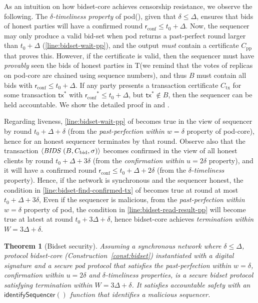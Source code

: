 \documentclass[pdflatex,sn-mathphys-num]{sn-jnl}%
\theoremstyle{thmstyleone}%
\newtheorem{theorem}{Theorem}%
\theoremstyle{thmstyletwo}%
\theoremstyle{thmstylethree}%
\newcommand{\podtm}{\textsf{pod}\xspace}
\newcommand{\bidsettm}{\textsf{bidset}\xspace}
\newcommand{\bidcert}{\ensuremath{C_\text{bid}}\xspace}
\newcommand{\operand}[1]{\textsf{#1}}
\newcommand{\tx}{\operand{tx}\xspace}
\newcommand{\round}{\operand{r}\xspace}
\newcommand{\rconf}{\ensuremath{\round_\text{conf}}\xspace}
\newcommand{\identifySequencer}[1]{\ensuremath{\mathsf{identifySequencer}(#1)}\xspace}
\newcommand{\txcert}{\ensuremath{C_\text{tx}}\xspace}
\newcommand{\ppcert}{\ensuremath{C_\text{pp}}\xspace}
\newcommand{\txSet}{\operand{T}\xspace}
\newcommand{\parConf}{\ensuremath{u}\xspace}
\newcommand{\parPerf}{\ensuremath{w}\xspace}
\newcommand{\parAuctionTerm}{\ensuremath{W}\xspace}
\newcommand{\confirmed}{confirmed\xspace}
\newcommand{\msg}[2]{\ensuremath{\langle\textit{\uppercase{#1 }}#2\rangle}\xspace}
\newcommand{\msgbidresult}[1]{\msg{bids}{ #1}}
\newcommand{\tzero}{\ensuremath{t_0}\xspace}
\newcommand{\bag}{\ensuremath{B}\xspace}
\begin{document}
As an intuition on how \bidsettm-core achieves censorship resistance, we observe the following.
The \emph{$\delta$-timeliness property} of \podtm (), given that $\delta \leq \Delta$, ensures that bids of honest parties will have a \confirmed round $\rconf \leq \tzero + \Delta$.
Now, the sequencer may only produce a valid bid-set when \podtm returns a past-perfect round larger than $\tzero + \Delta$ (\cref{line:bidset-wait-pp}), and the output \emph{must} contain a certificate \ppcert that proves this. However, if the certificate is valid, then the sequencer must have \emph{provably} seen the bids of honest parties in \txSet (we remind that the votes of replicas on \podtm-core are chained using sequence numbers), and thus \bag must contain all bids with $\rconf \leq \tzero + \Delta$. If any party presents a transaction certificate \txcert for some transaction $\tx^*$ with $\rconf^* \leq \tzero + \Delta$, but $\tx^* \not\in \bag$, then the sequencer can be held accountable. We show the detailed proof in  and .

Regarding liveness, \cref{line:bidset-wait-pp} of  becomes true in the view of sequencer by round $\tzero + \Delta + \delta$ (from the \emph{past-perfection within $\parPerf=\delta$} property of \podtm-core),
hence  for an honest sequencer terminates by that round.
Observe also that the transaction \msgbidresult{(\bag, \bidcert, \sigma)} becomes confirmed in the view of all honest clients by round $\tzero + \Delta + 3\delta$ (from the \emph{confirmation within $\parConf=2\delta$} property), and it will have a confirmed round $\rconf \leq \tzero + \Delta + 2\delta$ (from the \emph{$\delta$-timeliness} property).
Hence, if the network is synchronous and the sequencer honest, the condition in \cref{line:bidset-find-confirmed-tx} of  becomes true at round at most $\tzero + \Delta + 3\delta$,
Even if the sequencer is malicious, from the \emph{past-perfection within $\parPerf=\delta$} property of \podtm, the condition in \cref{line:bidset-read-result-pp} will become true at latest at round $\tzero + 3 \Delta + \delta$, hence \bidsettm-core achieves \emph{termination within $\parAuctionTerm=3\Delta + \delta$}.

\begin{theorem}[Bidset security]\label{thm:bidset-construction-secure}
Assuming a synchronous network where $\delta \leq \Delta$,
protocol \bidsettm-core (Construction~\ref{const:bidset}) instantiated with a digital signature and a  secure \podtm protocol that satisfies the \emph{past-perfection within $\parPerf = \delta$}, \emph{confirmation within $\parConf=2\delta$} and \emph{$\delta$-timeliness} properties, is a secure \bidsettm protocol satisfying \emph{termination within $\parAuctionTerm = 3\Delta + \delta$}.
It satisfies accountable safety with an \identifySequencer{} function that identifies a malicious sequencer.
\end{theorem}
\end{document}
